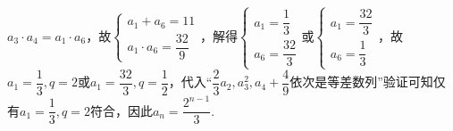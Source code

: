 \begin{enumerate}
\begin{enumerate}
\begin{jieda}
            $a_3 \cdot a_4 = a_1 \cdot a_6$，故$\left \{ \begin{array}{l}
                 a_1 + a_6 = 11  \\
                 a_1 \cdot a_6 = \dfrac{32}{9}
            \end{array} \right .$，解得$\left \{\begin{array}{l}
                 a_1 = \dfrac{1}{3}  \\
                 a_6 = \dfrac{32}{3}
            \end{array} \right.$或$\left \{\begin{array}{l}
                 a_1 = \dfrac{32}{3}  \\
                 a_6 = \dfrac{1}{3}
            \end{array} \right.$，故$a_1 = \dfrac{1}{3}, q = 2$或$a_1 = \dfrac{32}{3}, q = \dfrac{1}{2}$，代入“$\dfrac{2}{3}a_2, a_3^2, a_4+\dfrac{4}{9}$依次是等差数列”验证可知仅有$a_1 = \dfrac{1}{3}, q = 2$符合，因此$a_n = \dfrac{2^{n-1}}{3}$.
        \end{jieda}
        

\end{enumerate}
\end{enumerate}
